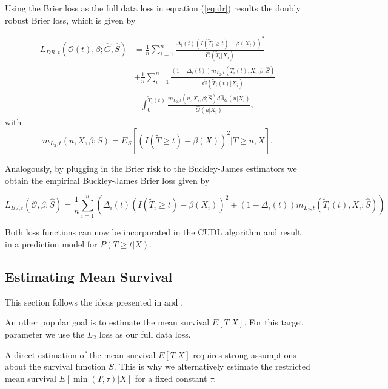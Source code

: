 \documentclass[12pt, a4paper]{article}
\theoremstyle{definition}
\theoremstyle{plain}
\numberwithin{equation}{section}
\numberwithin{figure}{section}
\numberwithin{table}{section}
\begin{document}
	Using the Brier loss as the full data loss in equation (\ref{eq:dr}) results the doubly robust Brier loss, which is given by
	
	\begin{equation*}
	\begin{split}
		L_{DR, t}(\mathcal{O}(t),\beta; \hat{G},\hat{S}) &=  \frac{1}{n} \sum_{i=1}^n \frac{\Delta_i(t)(I(\tilde{T}_i \geq t)-\beta(X_i))^2}{\hat{G}(\tilde{T}_i \vert X_i)}\\
		& + \frac{1}{n} \sum_{i=1}^n \frac{(1-\Delta_i(t))m_{L_2,t}(\tilde{T}_i(t),X_i,\beta; \hat{S})}{\hat{G}(\tilde{T}_i(t) \vert X_i)}\\
		& - \int_{0}^{\tilde{T}_i(t)} \frac{m_{L_2,t}(u,X_i,\beta; \hat{S})d\hat{\Lambda}_G(u\vert X_i)}{\hat{G}(u \vert X_i)},
	\end{split}
	\end{equation*}
	 with
	 \begin{equation*}
	 	m_{L_2,t}(u,X,\beta;S) = E_S[(I(\tilde{T}\geq t)-\beta(X))^2 \vert T \geq u, X].
	 \end{equation*}
	
	Analogously, by plugging in the Brier risk to the Buckley-James estimators we obtain the empirical Buckley-James Brier loss given by
	
	\begin{equation*}
		L_{BJ,t}(\mathcal{O},\beta; \hat{S}) = \frac{1}{n} \sum_{i=1}^n \left( \Delta_i(t)(I(\tilde{T}_i\geq t)-\beta(X_i))^2 + (1- \Delta_i(t))m_{L_2,t}(\tilde{T}_i(t), X_i; \hat{S})\right)
	\end{equation*}
	
	Both loss functions can now be incorporated in the CUDL algorithm and result in a prediction model for $P(T\geq t\vert X)$.

	\subsection{Estimating Mean Survival}
	
	This section follows the ideas presented in \citet*{basearticle} and \citet*{strawderman}.
	
	An other popular goal is to estimate the mean survival $E[T\vert X]$.
	For this target parameter we use the $L_2$ loss as our full data loss.
	
	A direct estimation of the mean survival $E[T\vert X]$ requires strong assumptions about the survival function $S$.
	This is why we alternatively estimate the restricted mean survival $E[\min(T, \tau)\vert X]$ for a fixed constant $\tau$.
	
\end{document}
